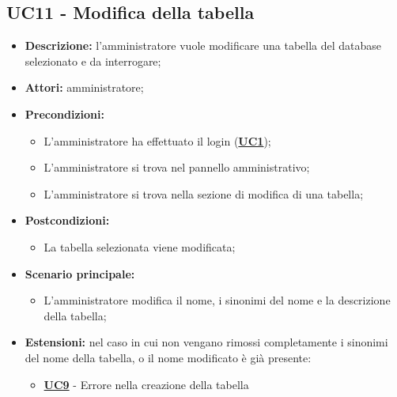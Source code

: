 \subsection{UC11 - Modifica della tabella}
\label{sec:UC11}
\begin{itemize}
	\item \textbf{Descrizione:} l’amministratore vuole modificare una tabella del database selezionato e da interrogare;
	\item \textbf{Attori:} amministratore;
	\item \textbf{Precondizioni:} 
	\begin{itemize}
		\item L’amministratore ha effettuato il login (\hyperref[sec:UC1]{\textbf{UC1}});
		\item L’amministratore si trova nel pannello amministrativo;
		\item L’amministratore si trova nella sezione di modifica di una tabella;
	\end{itemize}
	\item \textbf{Postcondizioni:} 
	\begin{itemize}
		\item La tabella selezionata viene modificata;
	\end{itemize}
	\item \textbf{Scenario principale:} 
	\begin{itemize}
		\item L’amministratore modifica il nome, i sinonimi del nome e la descrizione della tabella;
	\end{itemize}
	\item \textbf{Estensioni:} nel caso in cui non vengano rimossi completamente i sinonimi del nome della tabella, o il nome modificato è già presente:
	\begin{itemize}
		\item \hyperref[sec:UC9]{\textbf{UC9}} - Errore nella creazione della tabella
	\end{itemize}
\end{itemize}

